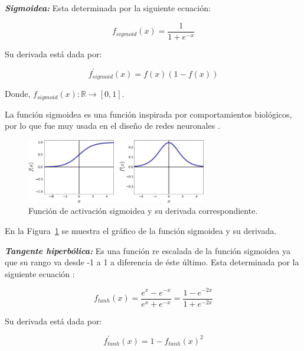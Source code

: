 \textbf{\textit{Sigmoidea:}} Esta determinada por la siguiente ecuación:

\begin{equation}
    f_{sigmoid}(x) = \frac{1}{1+e^{-x}}
\end{equation}

Su derivada está dada por:

\begin{equation}
    f^{'}_{sigmoid}(x) = f(x)(1-f(x))
\end{equation}

Donde, $ f_{sigmoid}(x): \mathbb{R} \rightarrow  [0,1] $.

La función sigmoidea es una función inspirada por comportamientos biológicos, por lo que fue muy usada en el diseño de redes neuronales \cite{aghdam2017guide}.

\begin{figure}[H]
    \begin{center}
        \includegraphics[width=0.7\textwidth]{Images/sigmoid.png}
    \end{center}
    \caption{Función de activación sigmoidea y su derivada correspondiente.}
    \label{fig:sigmoid}
\end{figure}

En la Figura~\ref{fig:sigmoid} se muestra el gráfico de la función sigmoidea y su derivada.

\textbf{\textit{Tangente hiperbólica:}} Es una función re escalada de la función sigmoidea ya que su rango va desde -1 a 1 a diferencia de éste último. Esta determinada por la siguiente ecuación \cite{castaneda2019evaluation}:

\begin{equation}
    f_{tanh}(x) = \frac{e^{x}-e^{-x}}{e^{x}+e^{-x}} = \frac{1 - e^{-2x}}{1 + e^{-2x}}
\end{equation}

Su derivada está dada por:

\begin{equation}
    f^{'}_{tanh}(x) = 1 - f_{tanh}(x)^{2}
\end{equation}

